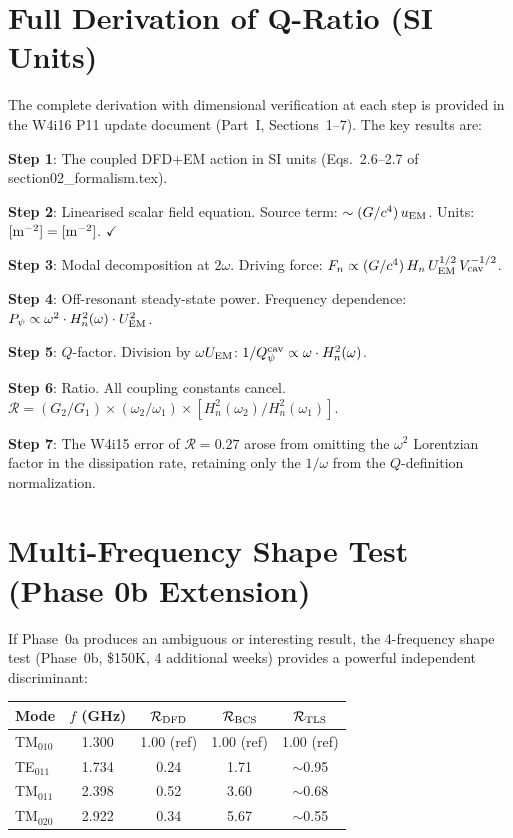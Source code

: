 \documentclass[11pt]{article}
\newcommand{\Rq}{\mathcal{R}}
\newcommand{\Heff}{H_n}
\begin{document}
\appendix
\section{Full Derivation of Q-Ratio (SI Units)}
\label{app:derivation}

The complete derivation with dimensional verification at each step
is provided in the W4i16 P11 update document (Part~I, Sections~1--7).
The key results are:

\textbf{Step 1}: The coupled DFD+EM action in SI units (Eqs.~2.6--2.7
of section02\_formalism.tex).

\textbf{Step 2}: Linearised scalar field equation. Source term:
$\sim (G/c^4)\,u_{\rm EM}$. Units: $[{\rm m}^{-2}] = [{\rm m}^{-2}]$.
$\checkmark$

\textbf{Step 3}: Modal decomposition at $2\omega$. Driving force:
$F_n \propto (G/c^4)\,\Heff\,U_{\rm EM}^{1/2}\,V_{\rm cav}^{-1/2}$.

\textbf{Step 4}: Off-resonant steady-state power. Frequency dependence:
$P_\psi \propto \omega^2 \cdot \Heff^2(\omega) \cdot U_{\rm EM}^2$.

\textbf{Step 5}: $Q$-factor. Division by $\omega U_{\rm EM}$:
$1/Q_\psi^{\rm cav} \propto \omega \cdot \Heff^2(\omega)$.

\textbf{Step 6}: Ratio. All coupling constants cancel.
$\Rq = (G_2/G_1) \times (\omega_2/\omega_1) \times
[\Heff^2(\omega_2)/\Heff^2(\omega_1)]$.

\textbf{Step 7}: The W4i15 error of $\Rq = 0.27$ arose from omitting
the $\omega^2$ Lorentzian factor in the dissipation rate, retaining
only the $1/\omega$ from the $Q$-definition normalization.


\section{Multi-Frequency Shape Test (Phase 0b Extension)}
\label{app:shape}

If Phase~0a produces an ambiguous or interesting result, the
4-frequency shape test (Phase~0b, \$150K, 4 additional weeks) provides
a powerful independent discriminant:

\begin{center}
\renewcommand{\arraystretch}{1.2}
\begin{tabular}{@{}lcccc@{}}
\toprule
\textbf{Mode} & $f$ (GHz) & $\Rq_{\rm DFD}$ & $\Rq_{\rm BCS}$ &
$\Rq_{\rm TLS}$ \\
\midrule
TM$_{010}$ & 1.300 & 1.00 (ref) & 1.00 (ref) & 1.00 (ref) \\
TE$_{011}$ & 1.734 & 0.24 & 1.71 & $\sim$0.95 \\
TM$_{011}$ & 2.398 & 0.52 & 3.60 & $\sim$0.68 \\
TM$_{020}$ & 2.922 & 0.34 & 5.67 & $\sim$0.55 \\
\bottomrule
\end{tabular}
\end{center}
\end{document}
